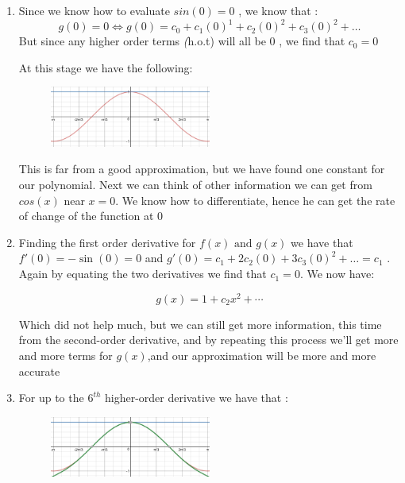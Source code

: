 \documentclass[english,course]{Notes}
\newcommand{\ita}[1]{\textit{#1}}
\begin{document}
\begin{enumerate}
	\item Since we know how to evaluate $sin(0) = 0$ , we know that : 
	$$g(0) = 0 \iff g(0) = c_0 + c_1(0)^1 + c_2(0)^2 + c_3(0)^2 + \dots$$ 
	But since any higher order terms \ita(h.o.t) will all be $0$ , we find that $c_0 = 0$
	
	At this stage we have the following:


\begin{figure}[h]
\centering
\includegraphics[width=0.5\textwidth]{taylor1st}
\end{figure}


\par{ This is far from a good approximation, but we have found one constant for our polynomial. Next we can think of other information we can get from $cos(x)$ near $x=0$. We know how to differentiate, hence he can get the rate of change of the function at $0$}

\item Finding the first order derivative for $f(x) \text{ and } g(x)$ we have that $f'(0) = -\sin(0) = 0$ and $g'(0) =  c_1 + 2c_2(0) + 3c_3(0)^2 + \dots = c_1$ . Again by equating the two derivatives we find that $c_1 = 0$. We now have: 

$$ g(x) = 1 + c_2x^2 + \cdots $$

\par{ Which did not help much, but we can still get more information, this time from the second-order derivative, and by repeating this process we'll get more and more terms for $g(x)$,and our approximation will be more and more accurate}

\item For up to the $6^{th}$ higher-order derivative we have that :

\begin{figure}[h]
\centering
\includegraphics[width=0.5\textwidth]{taylor2nd}
\end{figure}



\end{enumerate}
\end{document}
